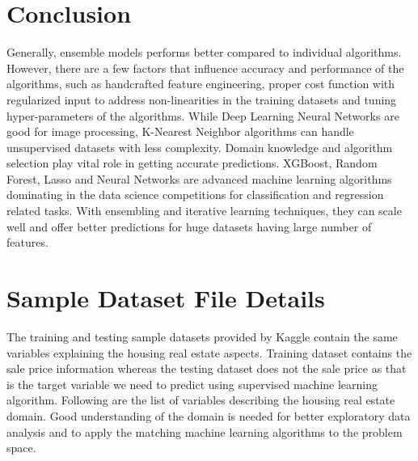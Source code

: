 \documentclass[sigconf]{acmart}
\begin{document}
   
	\section{Conclusion}
	
	Generally, ensemble models performs better compared to individual algorithms. However, there are a few factors that influence accuracy and performance of the algorithms, such as handcrafted feature engineering, proper cost function with regularized input to address non-linearities in the training datasets and tuning hyper-parameters of the algorithms. While Deep Learning Neural Networks are good for image processing, K-Nearest Neighbor algorithms can handle unsupervised datasets with less complexity. Domain knowledge and algorithm selection play vital role in getting accurate predictions. XGBoost, Random Forest, Lasso and Neural Networks are advanced machine learning algorithms dominating in the data science competitions for classification and regression related tasks. With ensembling and iterative learning techniques, they can scale well and offer better predictions for huge datasets having large number of features. 
		
	\appendix
	
	\section{Sample Dataset File Details}
	The training and testing sample datasets provided by Kaggle contain the same variables explaining the housing real estate aspects. Training dataset contains the sale price information whereas the testing dataset does not the sale price as that is the target variable we need to predict using supervised machine learning algorithm. Following are the list of variables describing the housing real estate domain. Good understanding of the domain is needed for better exploratory data analysis and to apply the matching machine learning algorithms to the problem space.
	
\end{document}
